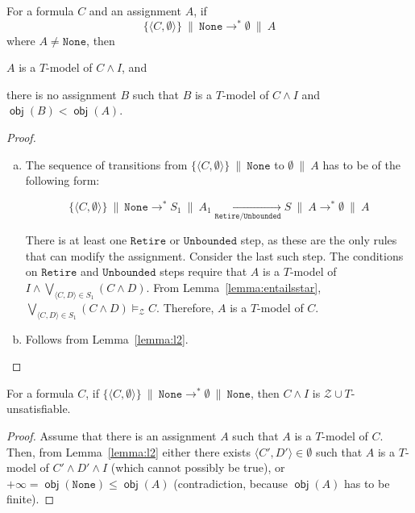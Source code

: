 \documentclass{llncs}
\newcommand\none[0]{\ensuremath{\mathtt{None}}}
\newcommand{\tr}[1]{\ensuremath{\mathtt{#1}}}
\newcommand{\state}[2]{\ensuremath{#1\ \|\ #2}}
\newcommand{\statenone}[1]{\state{#1}{\none}}
\newcommand{\subp}[2]{\ensuremath{\langle#1, #2\rangle}}
\newcommand{\Z}[0]{\ensuremath{\mathcal{Z}}}
\newcommand{\ZT}[0]{\ensuremath{\mathcal{Z} \cup T}}
\newcommand{\modelsz}[0]{\ensuremath{ \models_{\Z} }}
\newcommand{\setsp}[2]{\ensuremath{\{ \subp{#1}{#2} \}}}
\newcommand{\transstar}[0]{\ensuremath{ \longrightarrow^{*} }}
\newcommand{\transannot}[1]{\underset{\tr{#1}}{\longrightarrow}}
\newcommand{\cd}{\subp{C}{D}}
\newcommand{\obj}[1]{\ensuremath{\operatorname{\mathsf{obj}}(#1)}}
\begin{document}
\begin{theorem}
  \label{thm:sound-sat}
  For a formula $C$ and an assignment $A$, if
  $$\statenone{\setsp{C}{\emptyset}} \transstar \state{\emptyset}{A}$$
  where $A \neq \none$, then
  \begin{inparaenum}[(a)]
  \item $A$ is a $T$-model of $C \wedge I$, and
  \item there is no assignment $B$ such that $B$ is a $T$-model of $C
    \wedge I$ and $\obj{B} < \obj{A}$.
  \end{inparaenum}
\end{theorem}
\begin{proof}
  \begin{enumerate}[(a)]

  \item The sequence of transitions from
    \statenone{\setsp{C}{\emptyset}} to \state{\emptyset}{A} has to be
    of the following form:
    
    \[
    \statenone{\setsp{C}{\emptyset}} \transstar \state{S_1}{A_1}
    \transannot{Retire / Unbounded}
    \state{S}{A} \transstar \state{\emptyset}{A}
    \]
    
    There is at least one \tr{Retire} or \tr{Unbounded} step, as these
    are the only rules that can modify the assignment. Consider the
    last such step. The conditions on \tr{Retire} and \tr{Unbounded}
    steps require that $A$ is a $T$-model of $I \wedge \bigvee_{\cd
      \in S_1} (C \wedge D)$. From Lemma~\ref{lemma:entailsstar},
    $\bigvee_{\cd \in S_1} (C \wedge D) \modelsz C$. Therefore, $A$
    is a $T$-model of $C$. \vspace{6pt}

  \item Follows from Lemma~\ref{lemma:l2}.
  
  \end{enumerate}
\end{proof}

\begin{theorem}
  \label{thm:sound-unsat}
  For a formula $C$, if $\statenone{\setsp{C}{\emptyset}} \transstar
  \statenone{\emptyset}$, then $C \wedge I$ is \ZT{}-unsatisfiable.
\end{theorem}
\begin{proof}
  Assume that there is an assignment $A$ such that $A$ is a $T$-model
  of $C$. Then, from Lemma~\ref{lemma:l2} either there exists
  $\subp{C'}{D'} \in \emptyset$ such that $A$ is a $T$-model of $C'
  \wedge D' \wedge I$ (which cannot possibly be true), or $+\infty =
  \obj{\none} \leq \obj{A}$ (contradiction, because $\obj{A}$ has to
  be finite).
\end{proof}
\end{document}
